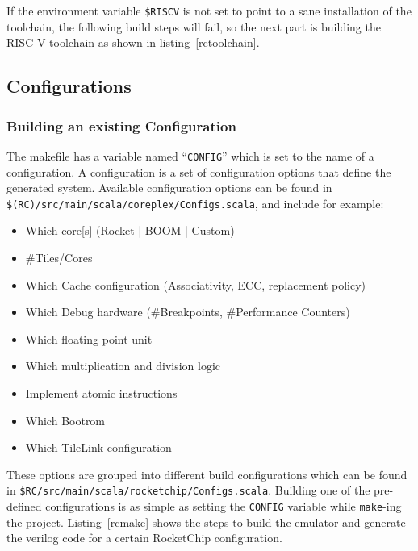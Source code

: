 \documentclass[journal,a4paper]{IEEEtran}
\begin{document}
If the environment variable \texttt{\$RISCV} is not set to point to a sane installation of the toolchain, the following build steps will fail, so the next part is building the RISC-V-toolchain as shown in listing~\ref{rctoolchain}.

\subsection{Configurations}

\subsubsection{Building an existing Configuration}
The makefile has a variable named ``\texttt{CONFIG}'' which is set to the name of a configuration.
A configuration is a set of configuration options that define the generated system.
Available configuration options can be found in \texttt{\$(RC)/src/main/scala/coreplex/Configs.scala}, and include for example:

\begin{itemize}
	\item Which core[s] (Rocket | BOOM | Custom)
	\item \#Tiles/Cores
	\item Which Cache configuration (Associativity, ECC, replacement policy)
	\item Which Debug hardware (\#Breakpoints, \#Performance Counters)
	\item Which floating point unit
	\item Which multiplication and division logic
	\item Implement atomic instructions
	\item Which Bootrom
	\item Which TileLink configuration
\end{itemize}
These options are grouped into different build configurations which can be found in \texttt{\$RC/src/main/scala/rocketchip/Configs.scala}.
Building one of the pre-defined configurations is as simple as setting the \texttt{CONFIG} variable while \texttt{make}-ing the project.
Listing~\ref{rcmake} shows the steps to build the emulator and generate the verilog code for a certain RocketChip configuration.
\end{document}
